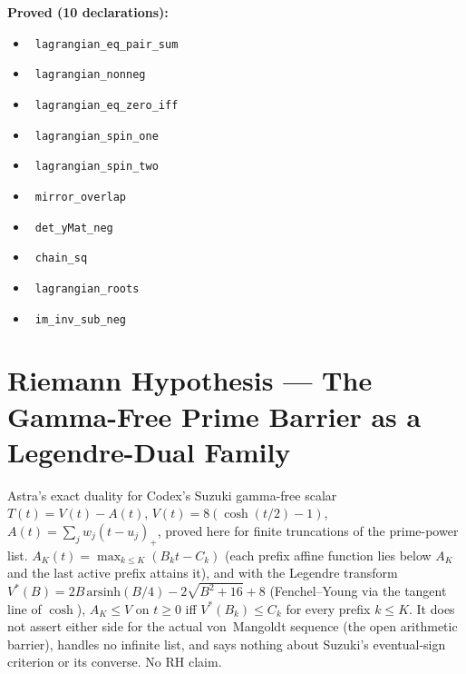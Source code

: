 \documentclass{report}
\theoremstyle{definition}
\begin{document}
\noindent\textbf{Proved (10 declarations):}
\begin{itemize}
  \item {}\leanok\ \texttt{lagrangian\_eq\_pair\_sum}
  \item {}\leanok\ \texttt{lagrangian\_nonneg}
  \item {}\leanok\ \texttt{lagrangian\_eq\_zero\_iff}
  \item {}\leanok\ \texttt{lagrangian\_spin\_one}
  \item {}\leanok\ \texttt{lagrangian\_spin\_two}
  \item {}\leanok\ \texttt{mirror\_overlap}
  \item {}\leanok\ \texttt{det\_yMat\_neg}
  \item {}\leanok\ \texttt{chain\_sq}
  \item {}\leanok\ \texttt{lagrangian\_roots}
  \item {}\leanok\ \texttt{im\_inv\_sub\_neg}
\end{itemize}

\section{Riemann Hypothesis --- The Gamma-Free Prime Barrier as a Legendre-Dual Family}
Astra's exact duality for Codex's Suzuki gamma-free scalar $T(t)=V(t)-A(t)$, $V(t)=8(\cosh(t/2)-1)$, $A(t)=\sum_j w_j(t-u_j)_+$, proved here for finite truncations of the prime-power list. $A_K(t)=\max_{k\le K}(B_kt-C_k)$ (each prefix affine function lies below $A_K$ and the last active prefix attains it), and with the Legendre transform $V^*(B)=2B\,\mathrm{arsinh}(B/4)-2\sqrt{B^2+16}+8$ (Fenchel--Young via the tangent line of $\cosh$), $A_K\le V$ on $t\ge0$ iff $V^*(B_k)\le C_k$ for every prefix $k\le K$. It does not assert either side for the actual von~Mangoldt sequence (the open arithmetic barrier), handles no infinite list, and says nothing about Suzuki's eventual-sign criterion or its converse. No RH claim.
\end{document}
